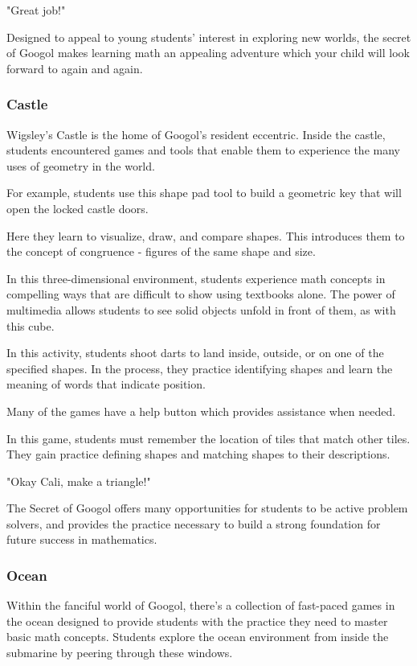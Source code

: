 "Great job!"

Designed to appeal to young students' interest in exploring new worlds, the secret of Googol makes learning math an appealing adventure which your child will look forward to again and again.

\subsubsection{Castle}

Wigsley's Castle is the home of Googol's resident eccentric.
Inside the castle, students encountered games and tools that enable them to experience the many uses of geometry in the world.

For example, students use this shape pad tool to build a geometric key that will open the locked castle doors.

Here they learn to visualize, draw, and compare shapes.
This introduces them to the concept of congruence - figures of the same shape and size.

In this three-dimensional environment, students experience math concepts in compelling ways that are difficult to show using textbooks alone.
The power of multimedia allows students to see solid objects unfold in front of them, as with this cube.

In this activity, students shoot darts to land inside, outside, or on one of the specified shapes.
In the process, they practice identifying shapes and learn the meaning of words that indicate position.

Many of the games have a help button which provides assistance when needed.

In this game, students must remember the location of tiles that match other tiles.
They gain practice defining shapes and matching shapes to their descriptions.

"Okay Cali, make a triangle!"

The Secret of Googol offers many opportunities for students to be active problem solvers, and provides the practice necessary to build a strong foundation for future success in mathematics.

\subsubsection{Ocean}

Within the fanciful world of Googol, there's a collection of fast-paced games in the ocean designed to provide students with the practice they need to master basic math concepts.
Students explore the ocean environment from inside the submarine by peering through these windows.

